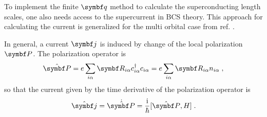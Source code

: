 \documentclass[../main.tex]{subfiles}
\begin{document}
To implement the finite \(\vb{q}\) method to calculate the superconducting length scales, one also needs access to the supercurrent in BCS theory.
This approach for calculating the current is generalized for the multi orbital case from ref. \cite{wittBypassingLatticeBCS2024}.

In general, a current \(\vb{j}\) is induced by change of the local polarization \(\vb{P}\).
The polarization operator is
\begin{equation}
	\ope{\vb{P}} = e \sum_{i \alpha} \vb{R}_{i \alpha} c_{i \alpha}^{\dagger} c_{i \alpha} = e \sum_{i \alpha} \vb{R}_{i \alpha} n_{i \alpha} \;,
\end{equation}
so that the current given by the time derivative of the polarization operator is
\begin{equation}
	\ope{\vb{j}} = \dot{\ope{\vb{P}}} = \frac{\iu}{\hbar} [\ope{\vb{P}}, H]
	\label{eq:current operator as time der of polarization} \;.
\end{equation}
\end{document}
